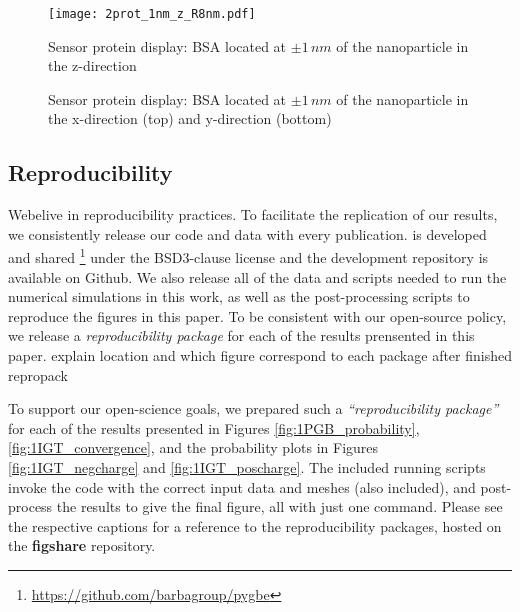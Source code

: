 \begin{figure*}[] %
   \centering
   \texttt{[image: 2prot\_1nm\_z\_R8nm.pdf]} 
   \caption{Sensor protein display: BSA located at $\pm 1 \, nm$ of the 
            nanoparticle in the z-direction}
   \label{fig:display_z}
\end{figure*}

\begin{figure*}[]

   \centering
    \vfill
    \caption{Sensor protein display: BSA located at $\pm 1 \, nm$ of the nanoparticle in the
            x-direction (top) and y-direction (bottom)}
    \label{fig:display_xy}
\end{figure*}

\subsection{Reproducibility} \label{sec:repro}

Webelive in reproducibility practices. To facilitate the replication of our results, 
we consistently release our code and data with every publication. \pygbe is developed and 
shared \footnote{\url{https://github.com/barbagroup/pygbe}} under the BSD3-clause 
license and the development repository is available on Github. We also release
all of the data and scripts needed to run the numerical simulations in this work, 
as well as the post-processing scripts to reproduce the figures in this paper. To be consistent with our open-source policy, we release a \textit{reproducibility package} for each of the results prensented in
this paper. {\color{red} explain location and which figure correspond to each package
after finished repropack}



 To support our open-science goals, we prepared such a \emph{``reproducibility package''} for each of the results presented in Figures \ref{fig:1PGB_probability}, \ref{fig:1IGT_convergence}, and the probability plots in Figures \ref{fig:1IGT_negcharge} and \ref{fig:1IGT_poscharge}. The included running scripts invoke the \pygbe code with the correct input data and meshes (also included), and post-process the results to give the final figure, all with just one command. Please see the respective captions for a reference to the reproducibility packages, hosted on the \textbf{figshare} repository.


\color{blue} 
